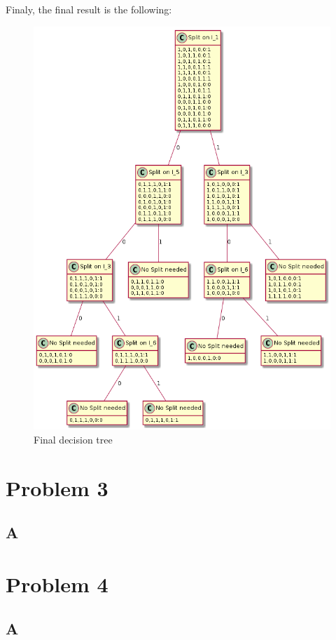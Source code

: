 \documentclass{article}
\begin{document}
            Finaly, the final result is the following:
            \begin{figure}[H]
                \centering
                \includegraphics[scale=0.5]{problem2/graph.png}
                \caption{Final decision tree}
            \end{figure}


    \section{Problem 3}
        \subsection{A}
    \section{Problem 4}
        \subsection{A}
\end{document}
